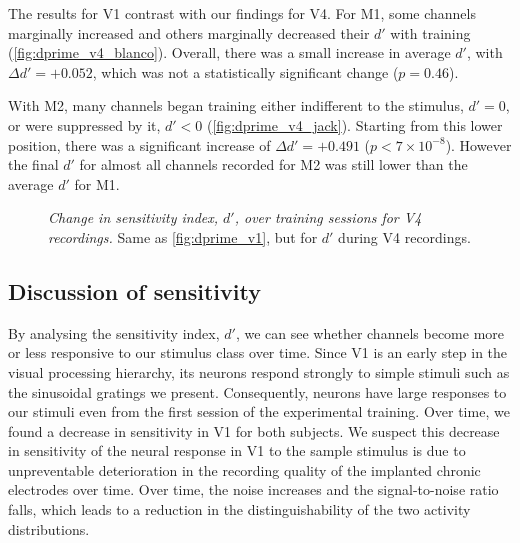 
The results for \ac{V1} contrast with our findings for \ac{V4}.
For \ac{M1}, some channels marginally increased and others marginally decreased their $d'$ with training (\autoref{fig:dprime_v4_blanco}).
Overall, there was a small increase in average $d'$, with $\Delta d' = +0.052$, which was not a statistically significant change ($p=0.46$).

With \ac{M2}, many channels began training either indifferent to the stimulus, $d'=0$, or were suppressed by it, $d'<0$ (\autoref{fig:dprime_v4_jack}).
Starting from this lower position, there was a significant increase of $\Delta d' = +0.491$ ($p < 7 \times 10 ^{-8}$).
However the final $d'$ for almost all channels recorded for \ac{M2} was still lower than the average $d'$ for \ac{M1}.

\begin{figure}[htbp]
    \centering
    \hspace*{\fill}
    \hspace*{\fill}\hspace{.2cm}\hspace*{\fill}
    \hspace*{\fill}
    \caption{
\textit{Change in sensitivity index, $d'$, over training sessions for \ac{V4} recordings.}
Same as \autoref{fig:dprime_v1}, but for $d'$ during \ac{V4} recordings.
}
    \label{fig:dprime_v4}
\end{figure}


\subsection{Discussion of sensitivity}
\label{sec:pl_dprime_discuss}

By analysing the sensitivity index, $d'$, we can see whether channels become more or less responsive to our stimulus class over time.
Since \ac{V1} is an early step in the visual processing hierarchy, its neurons respond strongly to simple stimuli such as the sinusoidal gratings we present.
Consequently, neurons have large responses to our stimuli even from the first session of the experimental training.
Over time, we found a decrease in sensitivity in \ac{V1} for both subjects.
We suspect this decrease in sensitivity of the neural response in \ac{V1} to the sample stimulus is due to unpreventable deterioration in the recording quality of the implanted chronic electrodes over time.
Over time, the noise increases and the signal-to-noise ratio falls, which leads to a reduction in the distinguishability of the two activity distributions.

